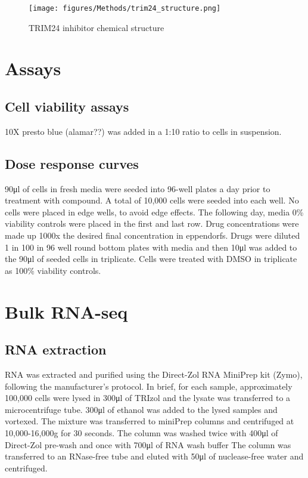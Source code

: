 \begin{figure}[htb]
\centering
\texttt{[image: figures/Methods/trim24\_structure.png]}
\caption[TRIM24i structure]{TRIM24 inhibitor chemical structure}
\label{fig:trim24_structure}
\end{figure}

\section{Assays}
\subsection{Cell viability assays}
10X presto blue (alamar??) was added in a 1:10 ratio to cells in suspension.

\subsection{Dose response curves}
90\si{\micro\litre} of cells in fresh media were seeded into 96-well plates a day prior to treatment with compound.
A total of 10,000 cells were seeded into each well.
No cells were placed in edge wells, to avoid edge effects.
The following day, media 0\% viability controls were placed in the first and last row.
Drug concentrations were made up 1000x the desired final concentration in eppendorfs.
Drugs were diluted 1 in 100 in 96 well round bottom plates with media and then 10\si{\micro\litre} was added to the 90\si{\micro\litre} of seeded cells in triplicate.
Cells were treated with DMSO in triplicate as 100\% viability controls.

\section{Bulk RNA-seq}
\subsection{RNA extraction}
RNA was extracted and purified using the Direct-Zol RNA MiniPrep kit (Zymo), following the manufacturer's protocol.
In brief, for each sample, approximately 100,000 cells were lysed in 300\si{\ul} of TRIzol and the lysate was transferred to a microcentrifuge tube.
300\si{\ul} of ethanol was added to the lysed samples and vortexed.
The mixture was transferred to miniPrep columns and centrifuged at 10,000-16,000g for 30 seconds.
The column was washed twice with 400\si{\ul} of Direct-Zol pre-wash and once with 700\si{\micro\litre} of RNA wash buffer
The column was transferred to an RNase-free tube and eluted with 50\si{\ul} of nuclease-free water and centrifuged.


